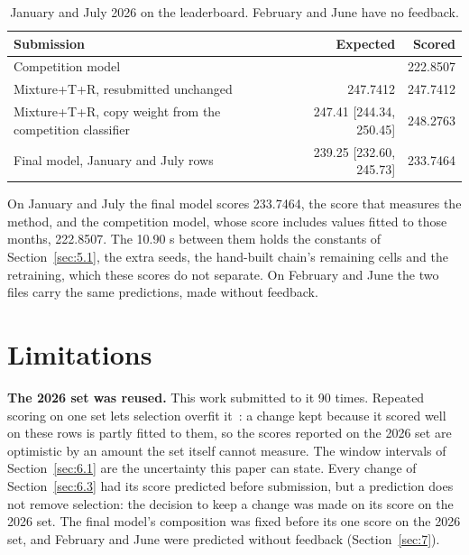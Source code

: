 \documentclass[
  manuscript=article,
  layout=preprint,
  year=2026,
  volume=x,
]{extra/joas}
\begin{document}
\begin{table}[htbp!]
  \centering
  \small
  \caption{January and July 2026 on the leaderboard. February and June have no feedback.}
  \label{tab:final_scores}
  \begin{tabular*}{\linewidth}{@{\extracolsep{\fill}}lrr}
  \toprule
  \textbf{Submission} & \textbf{Expected} & \textbf{Scored} \\
  \midrule
  Competition model & & 222.8507 \\
  Mixture+T+R, resubmitted unchanged & 247.7412 & 247.7412 \\
  Mixture+T+R, copy weight from the competition classifier & 247.41 [244.34, 250.45] & 248.2763 \\
  Final model, January and July rows & 239.25 [232.60, 245.73] & 233.7464 \\
  \bottomrule
  \end{tabular*}
\end{table}

On January and July the final model scores 233.7464, the score that measures the method, and the competition model, whose score includes values fitted to those months, 222.8507. The 10.90 s between them holds the constants of Section~\ref{sec:5.1}, the extra seeds, the hand-built chain's remaining cells and the retraining, which these scores do not separate. On February and June the two files carry the same predictions, made without feedback.

\section{Limitations}\label{sec:8}

\textbf{The 2026 set was reused.} This work submitted to it 90 times. Repeated scoring on one set lets selection overfit it~\cite{blum2015ladder,dwork2015reusable}: a change kept because it scored well on these rows is partly fitted to them, so the scores reported on the 2026 set are optimistic by an amount the set itself cannot measure. The window intervals of Section~\ref{sec:6.1} are the uncertainty this paper can state. Every change of Section~\ref{sec:6.3} had its score predicted before submission, but a prediction does not remove selection: the decision to keep a change was made on its score on the 2026 set. The final model's composition was fixed before its one score on the 2026 set, and February and June were predicted without feedback (Section~\ref{sec:7}).
\end{document}
